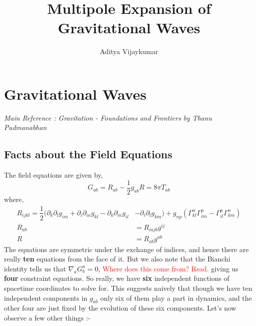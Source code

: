 \documentclass[a4paper,11pt]{article}
\title{\textbf{Multipole Expansion of Gravitational Waves}}
\author{Aditya Vijaykumar}
\affiliation{International Centre for Theoretical Sciences, Bengaluru, India.}
\begin{document}
\maketitle


\section{Gravitational Waves}
\textit{Main Reference : Gravitation - Foundations and Frontiers by Thanu Padmanabhan}

\subsection{Facts about the Field Equations}
The field equations are given by,
\begin{equation*}
G_{ab}  = R_{ab} - \dfrac{1}{2} g_{ab} R = 8 \pi T_{ab}
\end{equation*}
where,
\begin{align*}
R_{ijkl} = \dfrac{1}{2} (\partial_k \partial_l g_{im}  + \partial_i \partial_m g_{kl} - \partial_k \partial_m g_{il} &- \partial_i \partial_l g_{km}) + g_{np} (\Gamma^n_{kl} \Gamma^p_{im} - \Gamma^p_{il} \Gamma^n_{km}) \\
R_{ab} &= R_{iajb} g^{ij} \\
R &= R_{ab} g^{ab}
\end{align*}
The equations are symmetric under the exchange of indices, and hence there are really \textbf{ten} equations from the face of it. But we also note that the Bianchi identity tells us that $ \nabla_a G^a_{b} = 0 $, \textcolor{red}{Where does this come from? Read.} giving us \textbf{four} constraint equations. So really, we have \textbf{six} independent functions of spacetime coordinates to solve for. This suggests naively that though we have ten independent components in $ g_{ab} $ only six of them play a part in dynamics, and the other four are just fixed by the evolution of these six components. Let's now observe a few other things :-
\end{document}
